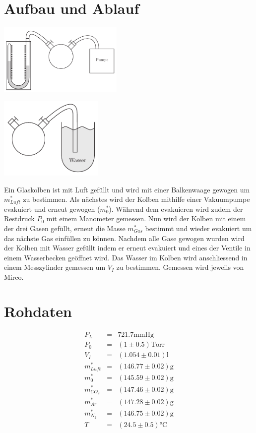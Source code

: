 \documentclass[12pt,a4paper]{article}
\begin{document}
\section*{Aufbau und Ablauf}
\begin{multicols}{2}
\includegraphics[width=6cm]{vakuum.pdf}

\includegraphics[width=5cm]{wasser.pdf}
\end{multicols}

\noindent
Ein Glaskolben ist mit Luft gefüllt und wird mit einer Balkenwaage gewogen um $m^*_{Luft}$ zu bestimmen. Als nächstes wird der Kolben mithilfe einer Vakuumpumpe evakuiert und erneut gewogen ($m^*_0$). Während dem evakuieren wird zudem der Restdruck $P_0$ mit einem Manometer gemessen. Nun wird der Kolben mit einem der drei Gasen gefüllt, erneut die Masse $m^*_{Gas}$ bestimmt und wieder evakuiert um das nächste Gas einfüllen zu können. Nachdem alle Gase gewogen wurden wird der Kolben mit Wasser gefüllt indem er erneut evakuiert und eines der Ventile in einem Wasserbecken geöffnet wird. Das Wasser im Kolben wird anschliessend in einem Messzylinder gemessen um $V_I$ zu bestimmen. Gemessen wird jeweils von Mirco.

\section*{Rohdaten}
\begin{eqnarray*}
P_L & = & 721.7 \mbox{mmHg} \\
P_0 & = & (1 \pm 0.5) \mbox{Torr} \\
V_I & = & (1.054 \pm 0.01) \mbox{l} \\
m^*_{Luft} & = & (146.77 \pm 0.02) \mbox{g} \\
m^*_{0} & = & (145.59 \pm 0.02)  \mbox{g} \\
m^*_{CO_2} & = & (147.46 \pm 0.02)  \mbox{g} \\
m^*_{Ar} & = & (147.28 \pm 0.02)  \mbox{g} \\
m^*_{N_2} & = & (146.75 \pm 0.02) \mbox{g} \\
T & = & (24.5 \pm 0.5)\mbox{°C}
\end{eqnarray*}
\end{document}

